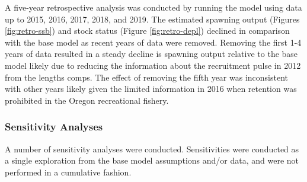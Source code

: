 \documentclass[11pt,
  english,
  a4paper,
]{article}
\begin{document}
\leavevmode\tagmcend\tagstructend


A five-year retrospective analysis was conducted by running the model using data up to 2015, 2016, 2017, 2018, and 2019. The estimated spawning output (Figures \ref{fig:retro-ssb}) and stock status (Figure \ref{fig:retro-depl}) declined in comparison with the base model as recent years of data were removed. Removing the first 1-4 years of data resulted in a steady decline is spawning output relative to the base model likely due to reducing the information about the recruitment pulse in 2012 from the lengths comps. The effect of removing the fifth year was inconsistent with other years likely given the limited information in 2016 when retention was prohibited in the Oregon recreational fishery.

\leavevmode\tagmcend\tagstructend\par


\hypertarget{sensitivity-analyses}{%
\subsubsection{Sensitivity Analyses}\label{sensitivity-analyses}}

\leavevmode\tagmcend\tagstructend


A number of sensitivity analyses were conducted. Sensitivities were conducted as a single exploration from the base model assumptions and/or data, and were not performed in a cumulative fashion.

\leavevmode\tagmcend\tagstructend\par
\end{document}
